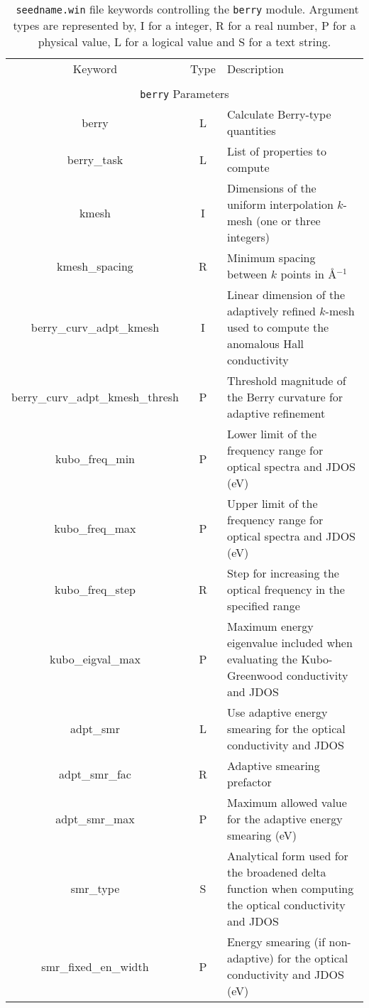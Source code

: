 \begin{table}[hH!]
\begin{center}
\begin{tabular}{|c|c|p{6cm}|}
  \hline
  Keyword & Type & Description \\
  &      &             \\
  \hline\hline
  \multicolumn{3}{|c|}{{\tt berry} Parameters} \\
  \hline
  {\sc berry}  & L & Calculate Berry-type quantities \\
  {\sc berry\_task}& L  & List of properties to compute \\
  {\sc [berry\_]kmesh} & I & Dimensions of the uniform interpolation $k$-mesh 
  (one or three integers)\\ 
  {\sc [berry\_]kmesh\_spacing}& R & Minimum spacing between $k$ points in 
  \AA$^{-1}$\\
  {\sc berry\_curv\_adpt\_kmesh} & I & Linear dimension of the adaptively refined $k$-mesh used to compute the anomalous Hall conductivity\\ 
  {\sc berry\_curv\_adpt\_kmesh\_thresh} & P & Threshold magnitude
  of the Berry curvature for adaptive refinement\\ 
  {\sc kubo\_freq\_min} & P & Lower limit of the frequency range for
  optical spectra and JDOS (eV) \\
  {\sc kubo\_freq\_max}& P & Upper limit of the frequency range for
  optical spectra and JDOS (eV) \\
  {\sc kubo\_freq\_step}& R &  Step for increasing
the optical frequency in the specified range\\
  {\sc kubo\_eigval\_max}& P &  Maximum energy eigenvalue
  included when evaluating the Kubo-Greenwood conductivity and JDOS\\
  {\sc [kubo\_]adpt\_smr} & L & Use adaptive energy smearing for the 
  optical conductivity and JDOS \\
  {\sc [kubo\_]adpt\_smr\_fac} & R & Adaptive smearing prefactor \\
  {\sc[kubo\_]adpt\_smr\_max} & P & Maximum allowed value for the 
  adaptive energy smearing (eV) \\
  {\sc [kubo\_]smr\_type} & S & Analytical form used for the broadened delta function
  when computing the optical conductivity and JDOS\\  
  {\sc [kubo\_]smr\_fixed\_en\_width} & P  & Energy smearing (if non-adaptive)
  for the optical conductivity and JDOS (eV) \\
  \hline
\end{tabular}
\caption[Parameter file keywords controlling the Berry module.]  {{\tt
    seedname.win} file keywords controlling the {\tt berry}
  module. Argument types are represented by, I for a integer, R for a
  real number, P for a physical value, L for a logical value and S for
  a text string.}
\label{parameter_keywords_berry}
\end{center}
\end{table}



